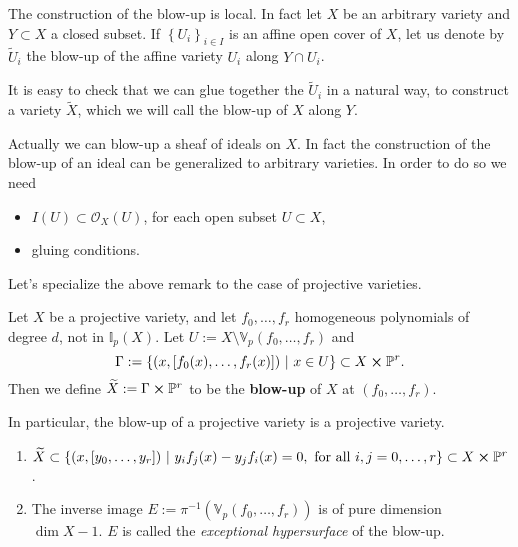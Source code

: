 \begin{rem}[]
	The construction of the blow-up is local.
	In fact let $X$ be an arbitrary variety and $Y \subset X$ a closed subset.
	If $\left\{ U_i \right\}_{i \in I}$ is an affine open cover of $X$, 
	let us denote by $\widetilde{U}_i$ the blow-up of the affine variety $U_i$
	along $Y \cap U_i$.

	It is easy to check that we can glue together the $\widetilde{U}_i$ in 
	a natural way, to construct a variety $\widetilde{X}$, which we will call the
	blow-up of $X$ along $Y$.

	Actually we can blow-up a sheaf of ideals on $X$.
	In fact the construction of the blow-up of an ideal can be generalized to arbitrary varieties.
	In order to do so we need
	\begin{itemize}
		\item $I(U) \subset \mathcal{O}_{X} \left( U \right)$, for each open subset $U \subset X$,
		\item gluing conditions.
	\end{itemize}
\end{rem}
Let's specialize the above remark to the case of projective varieties.
\begin{defn}
	Let $X$ be a projective variety, and let
	$f_0, \ldots, f_r$ homogeneous polynomials of degree $d$, not in $\mathbb{I}_p(X)$.
	Let $U := X \setminus \mathbb{V}_p\left( f_0, \ldots, f_r \right)$ and
	\begin{equation}
		\Gamma := \left\{ \left(x, [f_0(x), \ldots, f_r(x)]\right) \ \middle|\ 
		x \in U\right\} \subset X \cross \mathbb{P}^{r}
	.\end{equation} 
	Then we define $\widetilde{X} := \Gamma \cross \mathbb{P}^{r}$ to be the \textbf{blow-up}
	of $X$ at $(f_0, \ldots, f_r)$.
\end{defn}

\begin{rem}[]
	In particular, the blow-up of a projective variety is a projective variety.
\end{rem}

\begin{lem}\leavevmode\vspace{-.2\baselineskip}
	\begin{enumerate}
	\item $\widetilde{X} \subset \left\{ \left(x, [y_0, \ldots, y_r]\right) \ \middle|\ 
		y_i f_j(x) - y_j f_i(x) = 0, \text{ for all } i,j = 0, \ldots, r\right\}
		\subset X \cross \mathbb{P}^{r}$.
	\item The inverse image $E := \pi^{-1} \left( \mathbb{V}_p\left( f_0, \ldots, f_r \right) \right)$
		is of pure dimension $\dim X - 1$.
		$E$ is called the {\em exceptional hypersurface} of the blow-up.
	\end{enumerate}
\end{lem} 

